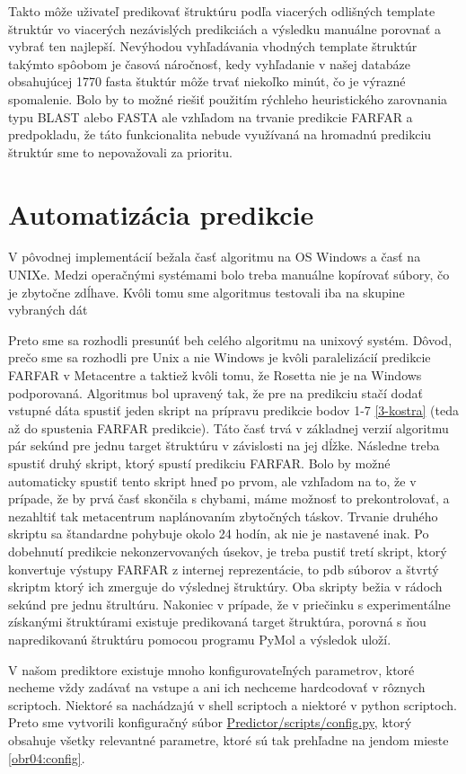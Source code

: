 \indent Takto môže uživateľ  predikovať štruktúru podľa viacerých odlišných template štruktúr vo viacerých nezávislých predikciách a výsledku manuálne porovnať a vybrať ten najlepší. Nevýhodou vyhľadávania vhodných template štruktúr takýmto spôobom je  časová náročnosť, kedy vyhľadanie v našej databáze obsahujúcej 1770 fasta štuktúr môže trvať niekoľko minút, čo je výrazné spomalenie. Bolo by to možné riešiť použitím rýchleho heuristického zarovnania typu BLAST alebo FASTA ale vzhľadom na trvanie predikcie FARFAR a predpokladu, že táto funkcionalita nebude využívaná na hromadnú predikciu štruktúr sme to nepovažovali za prioritu.


\section{Automatizácia predikcie}
V pôvodnej implementácií bežala časť algoritmu na OS Windows a časť na UNIXe. Medzi operačnými systémami bolo treba manuálne kopírovať súbory, čo je zbytočne zdĺhave. Kvôli tomu sme algoritmus testovali iba na skupine vybraných dát 

\indent Preto sme sa rozhodli presunúť beh celého algoritmu na unixový systém. Dôvod, prečo sme sa rozhodli pre Unix a nie Windows je kvôli paralelizácií predikcie FARFAR v Metacentre a taktiež kvôli tomu, že Rosetta nie je na Windows podporovaná. Algoritmus bol upravený tak, že pre na predikciu stačí dodať vstupné dáta spustiť jeden skript na prípravu predikcie bodov 1-7 \ref{3-kostra} (teda až do spustenia FARFAR predikcie). Táto časť trvá v základnej verzií algoritmu pár sekúnd pre jednu target štruktúru v závislosti na jej dĺžke.  Následne treba spustiť druhý skript, ktorý spustí predikciu FARFAR. Bolo by možné automaticky spustiť tento skript hneď po prvom, ale vzhľadom na to, že v prípade, že by prvá časť skončila s chybami, máme možnosť to prekontrolovať, a nezahltiť tak metacentrum naplánovaním zbytočných táskov. Trvanie druhého skriptu sa štandardne pohybuje okolo 24 hodín, ak nie je nastavené inak. Po dobehnutí predikcie nekonzervovaných úsekov, je treba pustiť tretí skript, ktorý konvertuje výstupy FARFAR z internej reprezentácie, to pdb súborov a štvrtý skriptm ktorý ich zmerguje do výslednej štruktúry. Oba skripty bežia v rádoch sekúnd pre jednu štrultúru. Nakoniec v prípade, že v priečinku s experimentálne získanými štruktúrami existuje predikovaná target štruktúra, porovná s ňou napredikovanú štruktúru pomocou programu PyMol a výsledok uloží.


\indent V našom prediktore existuje mnoho konfigurovateľných parametrov, ktoré necheme vždy zadávať na vstupe a ani ich nechceme hardcodovať v rôznych scriptoch. Niektoré sa nachádzajú v shell scriptoch a niektoré v python scriptoch. Preto sme vytvorili konfiguračný súbor \url{Predictor/scripts/config.py}, ktorý obsahuje všetky relevantné parametre, ktoré sú tak prehľadne na jendom mieste \ref{obr04:config}.


